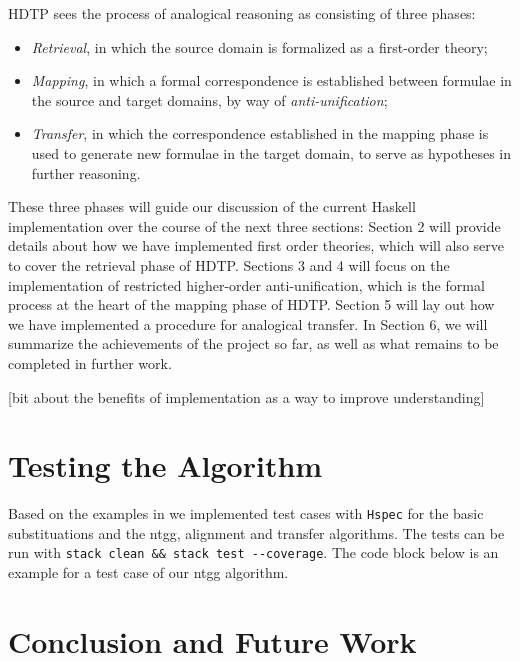 \documentclass[12pt,a4paper]{article}
\begin{document}
HDTP sees the process of analogical reasoning as consisting of three phases: 
\begin{itemize}
    \item \textit{Retrieval}, in which the source domain is formalized as a first-order theory;
    \item \textit{Mapping}, in which a formal correspondence is established between formulae in the source and target domains, by way of \textit{anti-unification};
    \item \textit{Transfer}, in which the correspondence established in the mapping phase is used to generate new formulae in the target domain, to serve as hypotheses in further reasoning.
\end{itemize} 

These three phases will guide our discussion of the current Haskell implementation over the course of the next three sections: Section 2 will provide details about how we have implemented first order theories, which will also serve to cover the retrieval phase of HDTP. Sections 3 and 4 will focus on the implementation of restricted higher-order anti-unification, which is the formal process at the heart of the mapping phase of HDTP. Section 5 will lay out how we have implemented a procedure for analogical transfer. In Section 6, we will summarize the achievements of the project so far, as well as what remains to be completed in further work.
% 

[bit about the benefits of implementation as a way to improve understanding]



\section{Testing the Algorithm}

Based on the examples in \cite{Schmidt-2014} we implemented test cases with \texttt{Hspec} for the basic substituations and the ntgg, alignment and transfer algorithms. The tests can be run with \verb|stack clean && stack test --coverage|. The code block below is an example for a test case of our ntgg algorithm.



\section{Conclusion and Future Work}
% 





\end{document}
